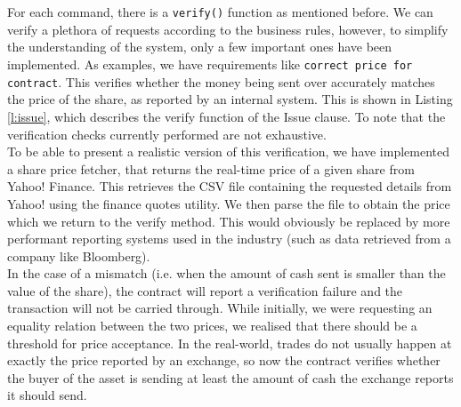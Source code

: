 \documentclass[12pt,twoside]{article}
\begin{document}
\\ \\
For each command, there is a \verb|verify()| function as mentioned before. We can verify a plethora of requests according to the business rules, however, to simplify the understanding of the system, only a few important ones have been implemented. As examples, we have requirements like \verb|correct price for contract|. This verifies whether the money being sent over accurately matches the price of the share, as reported by an internal system. This is shown in Listing \ref{l:issue}, which describes the verify function of the Issue clause. To note that the verification checks currently performed are not exhaustive.
\\

To be able to present a realistic version of this verification, we have implemented a share price fetcher, that returns the real-time price of a given share from Yahoo! Finance. This retrieves the CSV file containing the requested details from Yahoo! using the finance quotes utility. We then parse the file to obtain the price which we return to the verify method. This would obviously be replaced by more performant reporting systems used in the industry (such as data retrieved from a company like Bloomberg). 
\\
In the case of a mismatch (i.e. when the amount of cash sent is smaller than the value of the share), the contract will report a verification failure and the transaction will not be carried through. While initially, we were requesting an equality relation between the two prices, we realised that there should be a threshold for price acceptance. In the real-world, trades do not usually happen at exactly the price reported by an exchange, so now the contract verifies whether the buyer of the asset is sending at least the amount of cash the exchange reports it should send.
\\ \\
\end{document}
